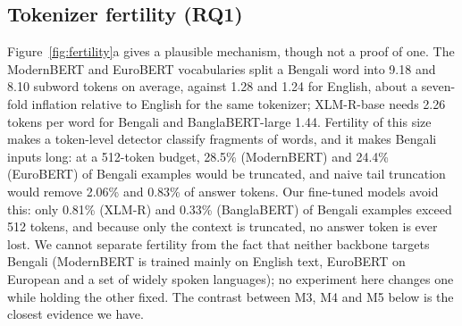 \documentclass[manuscript,screen,review]{acmart}
\newcommand{\fit}[1]{\resizebox{\ifdim\width>\linewidth\linewidth\else\width\fi}{!}{#1}}
\begin{document}
\begin{table}[t]
\caption{Zero-shot transfer to BangHallu (1,228 test rows): both released detectors fall below the lexical baseline. ``Native F1'' is Macro-F1 on the source-language test set (RAGTruth English, 2,675 examples; Chinese translation, 2,700); $\Delta$ is BangHallu F1 minus native F1. M1 and M2 are single deterministic runs.}
\label{tab:transfer}
\small
\fit{}
\end{table}

\subsection{Tokenizer fertility (RQ1)}\label{sec:fertility}
Figure~\ref{fig:fertility}a gives a plausible mechanism, though not a proof of one. The ModernBERT and EuroBERT vocabularies split a Bengali word into 9.18 and 8.10 subword tokens on average, against 1.28 and 1.24 for English, about a seven-fold inflation relative to English for the same tokenizer; XLM-R-base needs 2.26 tokens per word for Bengali and BanglaBERT-large 1.44. Fertility of this size makes a token-level detector classify fragments of words, and it makes Bengali inputs long: at a 512-token budget, 28.5\% (ModernBERT) and 24.4\% (EuroBERT) of Bengali examples would be truncated, and naive tail truncation would remove 2.06\% and 0.83\% of answer tokens. Our fine-tuned models avoid this: only 0.81\% (XLM-R) and 0.33\% (BanglaBERT) of Bengali examples exceed 512 tokens, and because only the context is truncated, no answer token is ever lost. We cannot separate fertility from the fact that neither backbone targets Bengali (ModernBERT is trained mainly on English text, EuroBERT on European and a set of widely spoken languages); no experiment here changes one while holding the other fixed. The contrast between M3, M4 and M5 below is the closest evidence we have.
\end{document}
